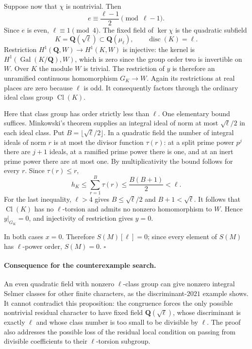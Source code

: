 \documentclass[11pt,a4paper]{article}
\theoremstyle{remark}
\begin{document}
Suppose now that $\chi$ is nontrivial.  Then
\[
 e\equiv\frac{\ell-1}{2}\pmod{\ell-1}.
\]
Since $e$ is even, $\ell\equiv1\pmod4$.  The fixed field of
$\ker\chi$ is the quadratic subfield
\[
 K=\mathbf Q(\sqrt\ell)\subset\mathbf Q(\mu_\ell),
 \qquad \operatorname{disc}(K)=\ell.
\]
Restriction
$H^1(\mathbf Q,W)\to H^1(K,W)$ is injective: the kernel is
$H^1(\operatorname{Gal}(K/\mathbf Q),W)$, which is zero since
the group order two is invertible on $W$.
Over $K$ the module $W$ is trivial.  The restriction of $y$ is
therefore an unramified continuous homomorphism $G_K\to W$.
Again its restrictions at real places are zero because $\ell$
is odd.  It consequently factors through the ordinary ideal
class group $\operatorname{Cl}(K)$.

Here that class group has order strictly less than $\ell$.
One elementary bound suffices.  Minkowski's theorem supplies an
integral ideal of norm at most $\sqrt\ell/2$ in each ideal class.
Put $B=\lfloor\sqrt\ell/2\rfloor$.  In a quadratic field the number
of integral ideals of norm $r$ is at most the divisor function
$\tau(r)$: at a split prime power $p^j$ there are $j+1$ ideals,
at a ramified prime power there is one, and at an inert prime
power there are at most one.  By multiplicativity the bound
follows for every $r$.  Since $\tau(r)\leq r$,
\[
 h_K\leq\sum_{r=1}^{B}\tau(r)
       \leq\frac{B(B+1)}2<\ell.
\]
For the last inequality, $\ell>4$ gives
$B\leq\sqrt\ell/2$ and $B+1<\sqrt\ell$.
It follows that $\operatorname{Cl}(K)$ has no $\ell$-torsion and
admits no nonzero homomorphism to $W$.  Hence $y|_{G_K}=0$, and
injectivity of restriction gives $y=0$.

In both cases $x=0$.  Therefore $S(M)[\ell]=0$; since every
element of $S(M)$ has $\ell$-power order, $S(M)=0$.
\hfill$\square$

\paragraph{Consequence for the counterexample search.}
An even quadratic field with nonzero $\ell$-class group can give
nonzero integral Selmer classes for other finite characters, as
the discriminant-$2021$ example shows.  It cannot contradict this
proposition: the congruence forces the only possible nontrivial
residual character to have fixed field $\mathbf Q(\sqrt\ell)$,
whose discriminant is exactly $\ell$ and whose class number is
too small to be divisible by $\ell$.  The proof also addresses
the possible loss of the residual local condition on passing
from divisible coefficients to their $\ell$-torsion subgroup.
\end{document}
